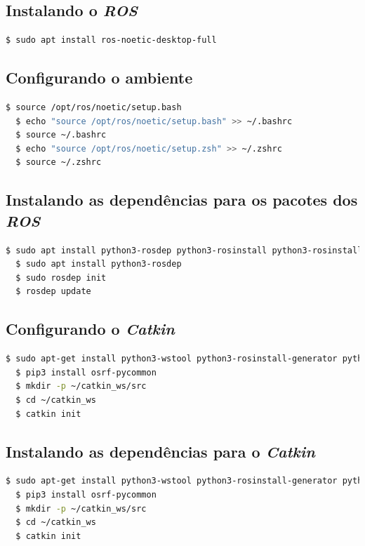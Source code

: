 \documentclass[12pt,a4paper,oneside]{book}
\begin{document}
\subsection{Instalando o \textit{ROS}}
\begin{lstlisting}[language=bash] 
  $ sudo apt install ros-noetic-desktop-full
\end{lstlisting}

\subsection{Configurando o ambiente}
\begin{lstlisting}[language=bash] 
  $ source /opt/ros/noetic/setup.bash
  $ echo "source /opt/ros/noetic/setup.bash" >> ~/.bashrc
  $ source ~/.bashrc
  $ echo "source /opt/ros/noetic/setup.zsh" >> ~/.zshrc
  $ source ~/.zshrc
\end{lstlisting}

\subsection{Instalando as dependências para os pacotes dos \textit{ROS}}
\begin{lstlisting}[language=bash] 
  $ sudo apt install python3-rosdep python3-rosinstall python3-rosinstall-generator python3-wstool build-essential
  $ sudo apt install python3-rosdep
  $ sudo rosdep init
  $ rosdep update
\end{lstlisting}

\subsection{Configurando o \textit{Catkin}}
\begin{lstlisting}[language=bash] 
  $ sudo apt-get install python3-wstool python3-rosinstall-generator python3-catkin-lint python3-pip python3-catkin-tools
  $ pip3 install osrf-pycommon
  $ mkdir -p ~/catkin_ws/src
  $ cd ~/catkin_ws
  $ catkin init
\end{lstlisting}

\subsection{Instalando as dependências para o \textit{Catkin}}
\begin{lstlisting}[language=bash] 
  $ sudo apt-get install python3-wstool python3-rosinstall-generator python3-catkin-lint python3-pip python3-catkin-tools
  $ pip3 install osrf-pycommon
  $ mkdir -p ~/catkin_ws/src
  $ cd ~/catkin_ws
  $ catkin init
\end{lstlisting}
\end{document}
